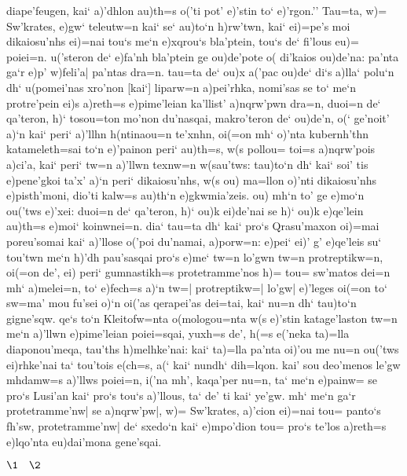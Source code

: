 \documentclass[11pt]{book}
\newcommand {\Spar} {\Npar*{=+1}\numerus{1}}
\newcommand {\Stephanus} [2]{%
\stephanus{St. \ROMANnumeral{#1}\\p. #2}\leavevmode\Npag{#2}%
}
\begin{document}
diape'feugen, kai` a)'dhlon au)th=s o('ti pot' e)'stin to` e)'rgon.''
Tau=ta, w)= Sw'krates, e)gw` teleutw=n kai` se` au)to`n h)rw'twn, kai`
ei)=pe's moi dikaiosu'nhs ei)=nai tou`s me`n e)xqrou`s bla'ptein,
\Spar
tou`s de` fi'lous eu)= poiei=n. u('steron de` e)fa'nh bla'ptein ge
ou)de'pote o( di'kaios ou)de'na: pa'nta ga`r e)p' w)feli'a| pa'ntas dra=n.
tau=ta de` ou)x a('pac ou)de` di`s a)lla` polu`n dh` u(pomei'nas xro'non
[kai`] liparw=n a)pei'rhka, nomi'sas se to` me`n protre'pein ei)s a)reth=s
e)pime'leian ka'llist' a)nqrw'pwn dra=n, duoi=n de` qa'teron, h)`
tosou=ton mo'non du'nasqai, makro'teron de` ou)de'n, o(` ge'noit' a)`n
kai` peri` a)'llhn h(ntinaou=n te'xnhn, oi(=on mh` o)'nta kubernh'thn
katameleth=sai to`n e)'painon
\Spar
peri` au)th=s, w(s pollou= toi=s a)nqrw'pois a)ci'a, kai` peri`
tw=n a)'llwn texnw=n w(sau'tws: tau)to`n dh` kai` soi' tis e)pene'gkoi
ta'x' a)`n peri` dikaiosu'nhs, w(s ou) ma=llon o)'nti dikaiosu'nhs
e)pisth'moni, dio'ti kalw=s au)th`n e)gkwmia'zeis. ou) mh`n to' ge e)mo`n
ou('tws e)'xei: duoi=n de` qa'teron, h)` ou)k ei)de'nai se h)` ou)k
e)qe'lein au)th=s e)moi` koinwnei=n. dia` tau=ta dh` kai` pro`s
Qrasu'maxon oi)=mai poreu'somai kai` a)'llose o('poi du'namai, a)porw=n:
e)pei` ei)' g' e)qe'leis su` tou'twn me`n h)'dh pau'sasqai
\Spar
pro`s e)me` tw=n lo'gwn tw=n protreptikw=n, oi(=on de', ei) peri`
gumnastikh=s protetramme'nos h)= tou= sw'matos dei=n mh` a)melei=n, to`
e)fech=s a)`n tw=| protreptikw=| lo'gw| e)'leges oi(=on to` sw=ma' mou
fu'sei o)`n oi('as qerapei'as dei=tai, kai` nu=n dh` tau)to`n gigne'sqw.
qe`s to`n Kleitofw=nta o(mologou=nta w(s e)'stin katage'laston tw=n me`n
a)'llwn e)pime'leian poiei=sqai, yuxh=s de',
\Spar
h(=s e('neka ta)=lla diaponou'meqa, tau'ths h)melhke'nai: kai`
ta)=lla pa'nta oi)'ou me nu=n ou('tws ei)rhke'nai ta` tou'tois e(ch=s, a(`
kai` nundh` dih=lqon. kai' sou deo'menos le'gw mhdamw=s a)'llws poiei=n,
i('na mh', kaqa'per nu=n, ta` me`n e)painw= se pro`s Lusi'an kai` pro`s
tou`s a)'llous, ta` de' ti kai` ye'gw. mh` me`n ga`r protetramme'nw| se
a)nqrw'pw|, w)= Sw'krates, a)'cion ei)=nai tou= panto`s fh'sw,
protetramme'nw| de` sxedo`n kai` e)mpo'dion tou= pro`s te'los a)reth=s
e)lqo'nta eu)dai'mona gene'sqai.

\newpage





\Stephanus{2}{225} \(\1 \quad \2\)
\end{document}
